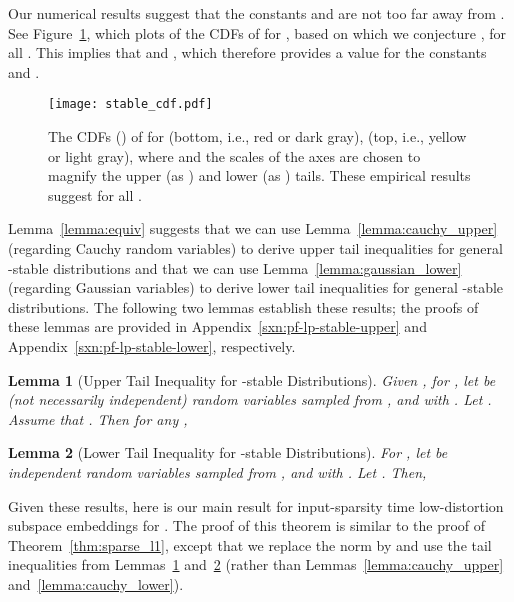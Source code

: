 \documentclass[11pt]{article}
\newtheorem{lemma}{Lemma}
\begin{document}
\noindent
Our numerical results suggest that the constants  and  
are not too far away from .
See Figure~\ref{fig:stable_cdf}, which plots of the CDFs of  for 
, based on which we conjecture 
, for all 
.
This implies that  and 
, 
which therefore provides a value for the constants  and .

\begin{figure}
  \centering
  \texttt{[image: stable\_cdf.pdf]}
\caption{The CDFs () of  for  (bottom, i.e., red or
    dark gray),  (top, i.e., yellow or light gray), where  and the scales of the axes are chosen to magnify the upper (as ) and lower (as ) tails.
    These empirical results suggest  for all .}
  \label{fig:stable_cdf}
\end{figure}

Lemma~\ref{lemma:equiv} suggests that we can use Lemma~\ref{lemma:cauchy_upper}
(regarding Cauchy random variables) to derive upper tail inequalities for
general -stable distributions and that we can use
Lemma~\ref{lemma:gaussian_lower} (regarding Gaussian variables) to derive lower
tail inequalities for general -stable distributions.
The following two lemmas establish these results; the proofs of these lemmas are
provided in Appendix~\ref{sxn:pf-lp-stable-upper} and
Appendix~\ref{sxn:pf-lp-stable-lower}, respectively.

\begin{lemma}[Upper Tail Inequality for -stable Distributions]
  \label{lemma:stable_upper}
  Given , for , let  be  (not necessarily
  independent) random variables sampled from , and  with
  .
  Let .
  Assume that .
  Then for any ,
  
\end{lemma}

\begin{lemma}[Lower Tail Inequality for -stable Distributions]
  \label{lemma:stable_lower}
  For , let  be independent random variables sampled from
  , and  with . Let . Then,
  
\end{lemma}

Given these results, here is our main result for input-sparsity time 
low-distortion subspace embeddings for .
The proof of this theorem is similar to the proof of 
Theorem~\ref{thm:sparse_l1}, except that we replace the  norm 
 by  and use the tail inequalities from 
Lemmas~\ref{lemma:stable_upper} and~\ref{lemma:stable_lower} (rather than 
Lemmas~\ref{lemma:cauchy_upper} and~\ref{lemma:cauchy_lower}).  
\end{document}
